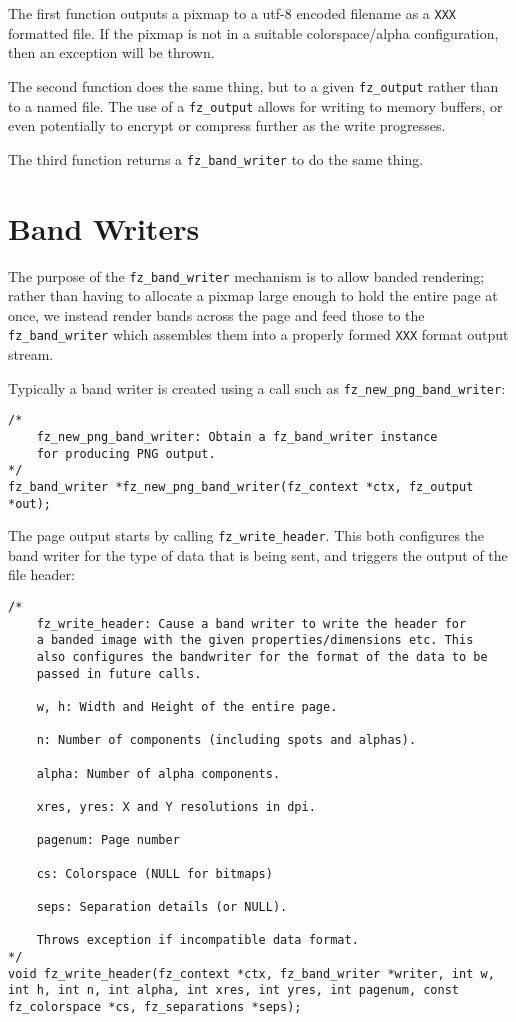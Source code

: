 \documentclass[oneside]{book}
\begin{document}
The first function outputs a pixmap to a utf-8 encoded filename as a \texttt{XXX} formatted file. If the pixmap is not in a suitable colorspace/alpha configuration, then an exception will be thrown.

The second function does the same thing, but to a given \texttt{fz\_output} rather than to a named file. The use of a \texttt{fz\_output} allows for writing to memory buffers, or even potentially to encrypt or compress further as the write progresses.

The third function returns a \texttt{fz\_band\_writer} to do the same thing.

\section{Band Writers}

The purpose of the \texttt{fz\_band\_writer} mechanism is to allow banded rendering; rather than having to allocate a pixmap large enough to hold the entire page at once, we instead render bands across the page and feed those to the \texttt{fz\_band\_writer} which assembles them into a properly formed \texttt{XXX} format output stream.

Typically a band writer is created using a call such as \texttt{fz\_new\_png\_band\_writer}:

\begin{lstlisting}
/*
	fz_new_png_band_writer: Obtain a fz_band_writer instance
	for producing PNG output.
*/
fz_band_writer *fz_new_png_band_writer(fz_context *ctx, fz_output *out);
\end{lstlisting}

The page output starts by calling \texttt{fz\_write\_header}. This both configures the band writer for the type of data that is being sent, and triggers the output of the file header:

\begin{lstlisting}
/*
	fz_write_header: Cause a band writer to write the header for
	a banded image with the given properties/dimensions etc. This
	also configures the bandwriter for the format of the data to be
	passed in future calls.

	w, h: Width and Height of the entire page.

	n: Number of components (including spots and alphas).

	alpha: Number of alpha components.

	xres, yres: X and Y resolutions in dpi.

	pagenum: Page number

	cs: Colorspace (NULL for bitmaps)

	seps: Separation details (or NULL).

	Throws exception if incompatible data format.
*/
void fz_write_header(fz_context *ctx, fz_band_writer *writer, int w, int h, int n, int alpha, int xres, int yres, int pagenum, const fz_colorspace *cs, fz_separations *seps);
\end{lstlisting}
\end{document}
